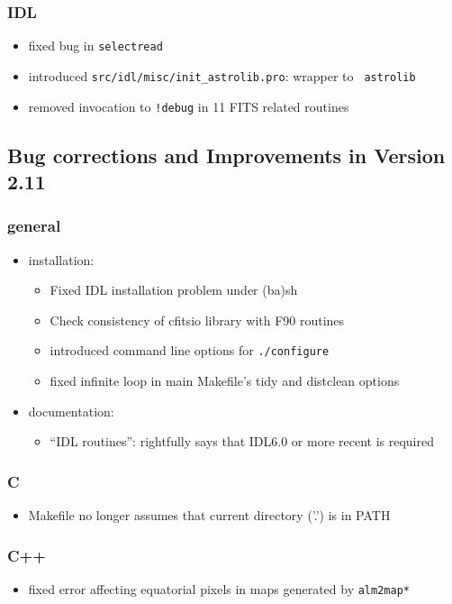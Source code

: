 \documentclass[12pt,twoside]{article}
\begin{document}
{{\subsubsection[IDL]{IDL}
	\begin{itemize}
	\item fixed bug in {\tt selectread}
	\item introduced {\tt src/idl/misc/init\_astrolib.pro}: wrapper to {\tt
astrolib}
	\item removed invocation to {\tt !debug} in 11 FITS related routines
	\end{itemize}
\subsection{Bug corrections and Improvements in Version 2.11}

\subsubsection[New General Improvements]{general}
\begin{itemize}
\item installation:
	\begin{itemize}
	\item Fixed IDL installation problem under (ba)sh
	\item Check consistency of cfitsio library with F90 routines
	\item introduced command line options for {\tt ./configure}
	\item fixed infinite loop in main Makefile's tidy and distclean options
	\end{itemize}
\item documentation:
	\begin{itemize}
	\item ``IDL routines'': rightfully says that IDL6.0 or more recent is required
	\end{itemize}
\end{itemize}


\subsubsection[C]{C}	
	\begin{itemize}
	\item Makefile no longer assumes that current directory ('.') is in PATH
	\end{itemize}

\subsubsection[C++]{C++}
	\begin{itemize}
	\item fixed error affecting equatorial pixels in maps generated by {\tt alm2map*}
	\end{itemize}

}}
\end{document}
